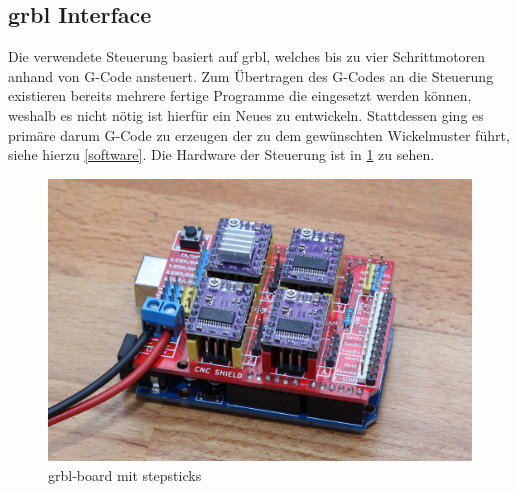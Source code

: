 \documentclass[paper=A4,pagesize,DIV=18, 12pt,listof=totoc,bibliography=totoc,headings=optiontohead,open=any]{article}
\begin{document}
\subsection{grbl Interface}
Die verwendete Steuerung basiert auf grbl\cite{grbl}, welches bis zu vier Schrittmotoren anhand von G-Code ansteuert. Zum Übertragen des G-Codes an die Steuerung existieren bereits mehrere fertige Programme die eingesetzt werden können, weshalb es nicht nötig ist hierfür ein Neues zu entwickeln. Stattdessen ging es primäre darum G-Code zu erzeugen der zu dem gewünschten Wickelmuster führt, siehe hierzu \ref{software}. Die Hardware der Steuerung ist in \ref{fig:grbl_board} zu sehen.
\begin{figure}[H]
	\centering
	\includegraphics[width=1\textwidth]{bilder/IMG_2662.JPG}
	\caption{grbl-board mit stepsticks} 
	\label{fig:grbl_board}
\end{figure}

\newpage
\printbibliography
\end{document}
